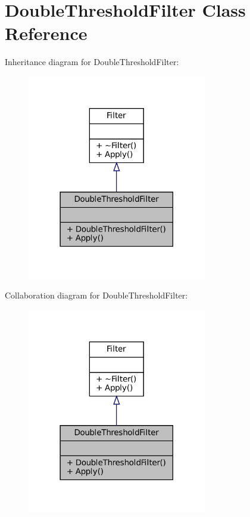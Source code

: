 \hypertarget{classDoubleThresholdFilter}{}\section{Double\+Threshold\+Filter Class Reference}
\label{classDoubleThresholdFilter}


Inheritance diagram for Double\+Threshold\+Filter\+:\nopagebreak
\begin{figure}[H]
\begin{center}
\leavevmode
\includegraphics[width=222pt]{classDoubleThresholdFilter__inherit__graph}
\end{center}
\end{figure}


Collaboration diagram for Double\+Threshold\+Filter\+:\nopagebreak
\begin{figure}[H]
\begin{center}
\leavevmode
\includegraphics[width=222pt]{classDoubleThresholdFilter__coll__graph}
\end{center}
\end{figure}
